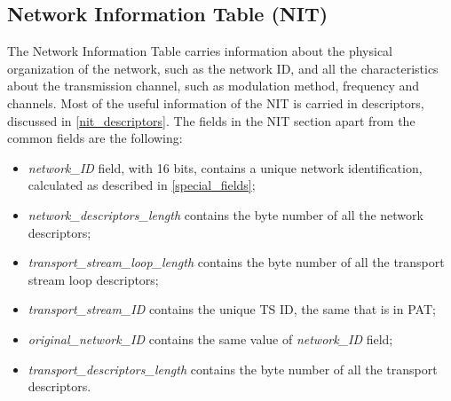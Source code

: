 \documentclass[
	12pt,				%
	openright,			%
	twoside,			%
	a4paper,			%
	brazil,
	french,				%
	english
	]{abntex2}
\begin{document}
\subsection{Network Information Table (NIT)}
\label{NIT}
The Network Information Table carries information about the physical organization of the network, such as the network ID, and all the characteristics about the transmission channel, such as modulation method, frequency and channels. Most of the useful information of the NIT is carried in descriptors, discussed in \autoref{nit_descriptors}. The fields in the NIT section apart from the common fields are the following:
\begin{itemize}
\item{\textit{network\hspace{0.1mm}\_\hspace{0.1mm}ID} field, with 16 bits, contains a unique network identification, calculated as described in \autoref{special_fields};}
\item{\textit{network\hspace{0.1mm}\_\hspace{0.1mm}descriptors\hspace{0.1mm}\_\hspace{0.1mm}length} contains the byte number of all the network descriptors;}
\item{\textit{transport\hspace{0.1mm}\_\hspace{0.1mm}stream\hspace{0.1mm}\_\hspace{0.1mm}loop\hspace{0.1mm}\_\hspace{0.1mm}length} contains the byte number of all the transport stream loop descriptors;}
\item{\textit{transport\hspace{0.1mm}\_\hspace{0.1mm}stream\hspace{0.1mm}\_\hspace{0.1mm}ID} contains the unique TS ID, the same that is in PAT;}
\item{\textit{original\hspace{0.1mm}\_\hspace{0.1mm}network\hspace{0.1mm}\_\hspace{0.1mm}ID}  contains the same value of \textit{network\hspace{0.1mm}\_\hspace{0.1mm}ID} field;}
\item{\textit{transport\hspace{0.1mm}\_\hspace{0.1mm}descriptors\hspace{0.1mm}\_\hspace{0.1mm}length} contains the byte number of all the transport descriptors.}
\end{itemize}
\end{document}
